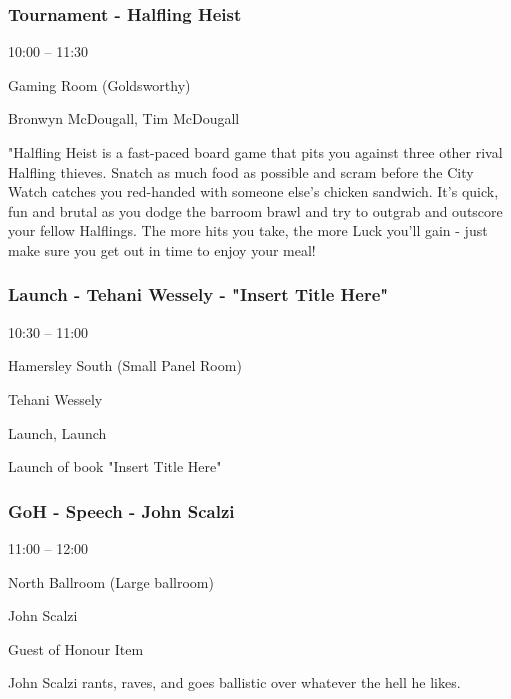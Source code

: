 \documentclass{scrreprt}
\begin{document}
\begin{multicols}{2}
\subsubsection*{Tournament - Halfling Heist}\begin{description}
\setlength{\itemsep}{0pt}
\setlength{\parsep}{0pt}
\setlength{\parskip}{0pt}
\item[Time:]{10:00 -- 11:30}
\item[Venue:]{Gaming Room (Goldsworthy)}
\item[People:]{Bronwyn McDougall, Tim McDougall}\end{description}
"Halfling Heist is a fast-paced board game that pits you against three other rival Halfling thieves. Snatch as much food as possible and scram before the City Watch catches you red-handed with someone else’s chicken sandwich. It’s quick, fun and brutal as you dodge the barroom brawl and try to outgrab and outscore your fellow Halflings. The more hits you take, the more Luck you’ll gain - just make sure you get out in time to enjoy your meal!
\subsubsection*{Launch - Tehani Wessely - "Insert Title Here"}\begin{description}
\setlength{\itemsep}{0pt}
\setlength{\parsep}{0pt}
\setlength{\parskip}{0pt}
\item[Time:]{10:30 -- 11:00}
\item[Venue:]{Hamersley South (Small Panel Room)}
\item[People:]{Tehani Wessely}
\item[Tags:]{Launch, Launch}\end{description}
Launch of book "Insert Title Here"
\subsubsection*{GoH - Speech - John Scalzi}\begin{description}
\setlength{\itemsep}{0pt}
\setlength{\parsep}{0pt}
\setlength{\parskip}{0pt}
\item[Time:]{11:00 -- 12:00}
\item[Venue:]{North Ballroom (Large ballroom)}
\item[People:]{John Scalzi}
\item[Tags:]{Guest of Honour Item}\end{description}
John Scalzi rants, raves, and goes ballistic over whatever the hell he likes.

\end{multicols}
\end{document}
